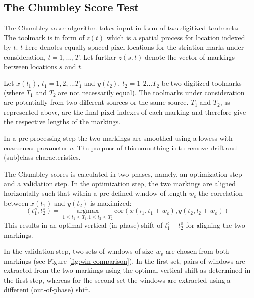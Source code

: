 \documentclass[12pt]{article}
\begin{document}
\subsection{The Chumbley Score Test}\label{the-chumbley-score-test}

The Chumbley score algorithm takes input in form of two digitized
toolmarks. The toolmark is in form of \(z(t)\) which is a spatial
process for location indexed by \(t\). \(t\) here denotes equally spaced
pixel locations for the striation marks under consideration,
\(t = 1, ..., T\). Let further \(z(s,t)\) denote the vector of markings
between locations \(s\) and \(t\).

Let \(x(t_1)\), \(t_1 = 1,2,...T_1\) and \(y(t_2)\), \(t_2 = 1,2...T_2\)
be two digitized toolmarks (where \(T_1\) and \(T_2\) are not
necessarily equal). The toolmarks under consideration are potentially
from two different sources or the same source. \(T_1\) and \(T_2\), as
represented above, are the final pixel indexes of each marking and
therefore give the respective lengths of the markings.

In a pre-processing step the two markings are smoothed using a lowess
\citep{lowess} with coarseness parameter \(c\). The purpose of this
smoothing is to remove drift and (sub)class characteristics.

The Chumbley scores is calculated in two phases, namely, an optimization
step and a validation step. In the optimization step, the two markings
are aligned horizontally such that within a pre-defined window of length
\(w_o\) the correlation between \(x(t_1)\) and \(y(t_2)\) is maximized:
\[
\left(t_1^o, t_2^o\right) = \mathop{\arg \max}\limits_{1 \le t_1 \le T_1, 1 \le t_2 \le T_2} \text{cor} \left(x (t_1, t_1 + w_o), y(t_2, t_2 + w_o) \right)
\] This results in an optimal vertical (in-phase) shift of
\(t_1^o - t_2^o\) for aligning the two markings.

In the validation step, two sets of windows of size \(w_v\) are chosen
from both markings (see Figure \ref{fig:win-comparison}). In the first
set, pairs of windows are extracted from the two markings using the
optimal vertical shift as determined in the first step, whereas for the
second set the windows are extracted using a different (out-of-phase)
shift.
\end{document}
